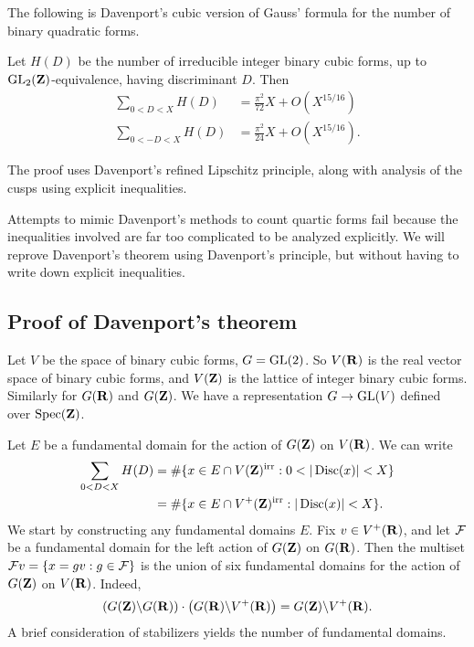 The following is Davenport's cubic version of Gauss' formula for the number of 
binary quadratic forms. 

\begin{theo}[Davenport]
Let $H(D)$ be the number of irreducible integer binary cubic forms, up to 
$\operatorname{GL}_2(\mathbf{Z})$-equivalence, having discriminant $D$. Then 
\begin{align*}
  \sum_{0<D<X} H(D) &= \frac{\pi^2}{72} X + O(X^{15/16}) \\
  \sum_{0<-D<X} H(D) &= \frac{\pi^2}{24} X + O(X^{15/16}) .
\end{align*}
\end{theo}

The proof uses Davenport's refined Lipschitz principle, along with analysis of 
the cusps using explicit inequalities. 

Attempts to mimic Davenport's methods to count quartic forms fail because the 
inequalities involved are far too complicated to be analyzed explicitly. We 
will reprove Davenport's theorem using Davenport's principle, but without 
having to write down explicit inequalities. 





\subsection{Proof of Davenport's theorem}

Let $V$ be the space of binary cubic forms, $G=\operatorname{GL}(2)$. So 
$V(\mathbf{R})$ is the real vector space of binary cubic forms, and $V(\mathbf{Z})$ is the 
lattice of integer binary cubic forms. Similarly for $G(\mathbf{R})$ and $G(\mathbf{Z})$. 
We have a representation $G\to \operatorname{GL}(V)$ defined over 
$\operatorname{Spec}(\mathbf{Z})$. 

Let $E$ be a fundamental domain for the action of $G(\mathbf{Z})$ on $V(\mathbf{R})$. We can 
write 
\begin{align*}
  \sum_{0<D<X} H(D) 
    &= \# \{x\in E\cap V(\dZ)^\irreducible:0<|\discriminant(x)| < X\} \\
    &= \# \{x\in E\cap V^+(\dZ)^\irreducible:|\discriminant(x)|<X\} .
\end{align*}
We start by constructing any fundamental domains $E$. Fix $v\in V^+(\mathbf{R})$, and 
let $\mathcal{F}$ be a fundamental domain for the left action of $G(\mathbf{Z})$ on $G(\mathbf{R})$. 
Then the multiset $\mathcal{F} v=\{x=g v:g\in \mathcal{F}\}$ is the union of six fundamental 
domains for the action of $G(\mathbf{Z})$ on $V(\mathbf{R})$. Indeed, 
\[
  \left(G(\mathbf{Z})\backslash G(\mathbf{R})\right) \cdot \left(G(\mathbf{R}) \backslash V^+(\mathbf{R})\right) = G(\mathbf{Z})\backslash V^+(\mathbf{R}) .
\]
A brief consideration of stabilizers yields the number of fundamental domains. 

